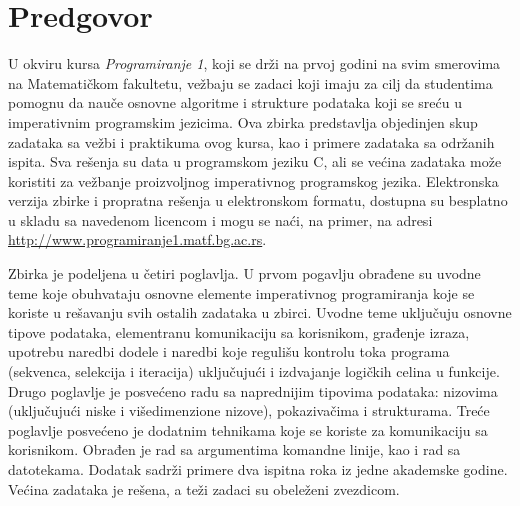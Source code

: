 \chapter*{Predgovor}

U okviru kursa {\em Programiranje 1}, koji se drži na prvoj godini na svim smerovima na Matematičkom fakultetu, vežbaju se zadaci koji imaju za cilj da studentima pomognu da nauče osnovne algoritme i strukture podataka koji se sreću u imperativnim programskim jezicima. Ova zbirka predstavlja objedinjen skup zadataka sa vežbi i praktikuma ovog kursa, kao i primere zadataka sa održanih ispita. Sva rešenja su data u programskom jeziku C, ali se većina zadataka može koristiti za vežbanje proizvoljnog imperativnog programskog jezika.
Elektronska verzija zbirke i propratna rešenja u elektronskom formatu, dostupna su besplatno u skladu sa navedenom licencom i mogu se naći, na primer, na adresi \url{http://www.programiranje1.matf.bg.ac.rs}.

Zbirka je podeljena u četiri poglavlja. U prvom pogavlju obrađene su uvodne teme koje obuhvataju osnovne elemente imperativnog programiranja koje se koriste u rešavanju svih ostalih zadataka u zbirci. Uvodne teme uključuju osnovne tipove podataka, elementranu komunikaciju sa korisnikom, građenje izraza, upotrebu naredbi dodele i naredbi koje regulišu kontrolu toka programa (sekvenca, selekcija i iteracija) uključujući i izdvajanje logičkih celina u funkcije. Drugo poglavlje je posvećeno radu sa naprednijim tipovima podataka: nizovima (uključujući niske i višedimenzione nizove), pokazivačima i strukturama. Treće poglavlje posvećeno je dodatnim tehnikama koje se koriste za komunikaciju sa korisnikom. Obrađen je rad sa argumentima komandne linije, kao i rad sa datotekama. Dodatak sadrži primere dva ispitna roka iz jedne akademske godine. Većina zadataka je rešena, a teži zadaci su obeleženi zvezdicom.

